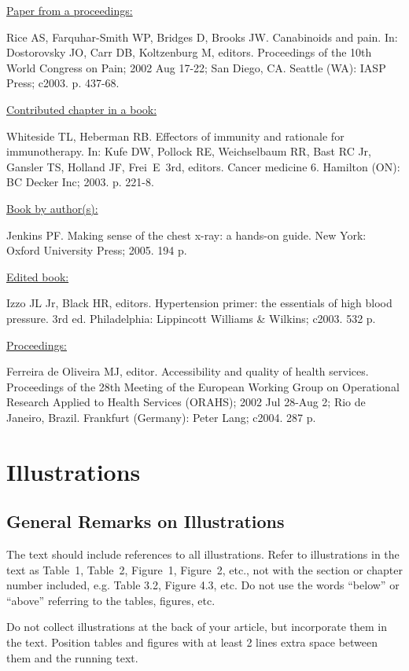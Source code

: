 \documentclass{IOS-Book-Article}
\begin{document}
\medskip
\noindent\ul{Paper from a proceedings:}\par\noindent
Rice AS, Farquhar-Smith WP, Bridges D, Brooks JW. Canabinoids and pain. In: Dostorovsky 
JO, Carr DB, Koltzenburg M, editors. Proceedings of the 10th World Congress on Pain; 
2002 Aug 17-22; San Diego, CA. Seattle (WA): IASP Press; c2003. p. 437-68.

\medskip
\noindent\ul{Contributed chapter in a book:}\par\noindent
Whiteside TL, Heberman RB. Effectors of immunity and rationale for immunotherapy. In: 
Kufe DW, Pollock RE, Weichselbaum RR, Bast RC Jr, Gansler TS, Holland JF, Frei~E~3rd, 
editors. Cancer medicine 6. Hamilton (ON): BC Decker Inc; 2003. p. 221-8.

\medskip
\noindent\ul{Book by author(s):}\par\noindent
Jenkins PF. Making sense of the chest x-ray: a hands-on guide. New York: Oxford 
University Press; 2005. 194 p.

\medskip
\noindent\ul{Edited book:}\par\noindent
Izzo JL Jr, Black HR, editors. Hypertension primer: the essentials of high blood pressure. 
3rd ed. Philadelphia: Lippincott Williams \& Wilkins; c2003. 532 p.

\medskip
\noindent\ul{Proceedings:}\par\noindent
Ferreira de Oliveira MJ, editor. Accessibility and quality of health services. Proceedings of 
the 28th Meeting of the European Working Group on Operational Research Applied to Health 
Services (ORAHS); 2002 Jul 28-Aug 2; Rio de Janeiro, Brazil. Frankfurt (Germany): Peter Lang; 
c2004. 287 p.

\section{Illustrations}

\subsection{General Remarks on Illustrations}
The text should include references to all illustrations. Refer to illustrations in the
text as Table~1, Table~2, Figure~1, Figure~2, etc., not with the section or chapter number
included, e.g. Table 3.2, Figure 4.3, etc. Do not use the words ``below'' or ``above''
referring to the tables, figures, etc.

Do not collect illustrations at the back of your article, but incorporate them in the
text. Position tables and figures with at least 2 lines
extra space between them and the running text.
\end{document}
